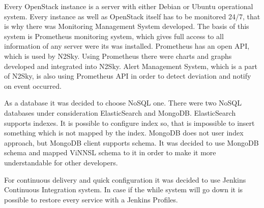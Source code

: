 Every OpenStack instance is a server with either Debian or Ubuntu operational system. Every instance as well as OpenStack itself has to be monitored 24/7, that is why there was Monitoring Management System developed. The basis of this system is Prometheus monitoring system, which gives full access to all information of any server were its was installed. Prometheus has an open API, which is used by N2Sky. Using Prometheus there were charts and graphs developed and integrated into N2Sky. Alert Management System, which is a part of N2Sky, is also using  Prometheus API in order to detect deviation and notify on event occurred.

As a database it was decided to choose NoSQL one. There were two NoSQL databases under consideration ElasticSearch and MongoDB. 
ElasticSearch supports indexes. It is possible to configure index so, that is impossible to insert something which is not mapped by the index.  MongoDB does not user index approach, but MongoDB client supports schema. It was decided to use MongoDB schema and mapped ViNNSL schema to it in order to make it more understandable for other developers. 

For continuous delivery and quick configuration it was decided to use Jenkins Continuous Integration system. In case if the while system will go down it is possible to restore every service with a Jenkins Profiles.


